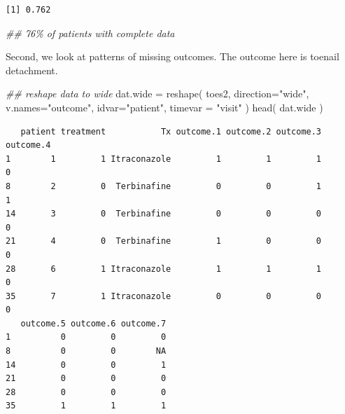 \documentclass[
  letterpaper,
  DIV=11,
  numbers=noendperiod]{scrreprt}
\newenvironment{Shaded}{}{}
\newcommand{\AttributeTok}[1]{\textcolor[rgb]{0.49,0.56,0.16}{#1}}
\newcommand{\DecValTok}[1]{\textcolor[rgb]{0.25,0.63,0.44}{#1}}
\newcommand{\DocumentationTok}[1]{\textcolor[rgb]{0.73,0.13,0.13}{\textit{#1}}}
\newcommand{\FunctionTok}[1]{\textcolor[rgb]{0.02,0.16,0.49}{#1}}
\newcommand{\NormalTok}[1]{#1}
\newcommand{\OtherTok}[1]{\textcolor[rgb]{0.00,0.44,0.13}{#1}}
\newcommand{\SpecialCharTok}[1]{\textcolor[rgb]{0.25,0.44,0.63}{#1}}
\newcommand{\StringTok}[1]{\textcolor[rgb]{0.25,0.44,0.63}{#1}}
\begin{document}
\begin{Shaded}
\end{Shaded}

\begin{verbatim}
[1] 0.762
\end{verbatim}

\begin{Shaded}
\begin{Highlighting}[]
  \DocumentationTok{\#\# 76\% of patients with complete data}
\end{Highlighting}
\end{Shaded}

Second, we look at patterns of missing outcomes. The outcome here is
toenail detachment.

\begin{Shaded}
\begin{Highlighting}[]
\DocumentationTok{\#\# reshape data to wide }
\NormalTok{  dat.wide }\OtherTok{=} \FunctionTok{reshape}\NormalTok{( toes2, }\AttributeTok{direction=}\StringTok{"wide"}\NormalTok{, }\AttributeTok{v.names=}\StringTok{"outcome"}\NormalTok{,}
                    \AttributeTok{idvar=}\StringTok{"patient"}\NormalTok{, }\AttributeTok{timevar =} \StringTok{"visit"}\NormalTok{ )}
  \FunctionTok{head}\NormalTok{( dat.wide )}
\end{Highlighting}
\end{Shaded}

\begin{verbatim}
   patient treatment           Tx outcome.1 outcome.2 outcome.3 outcome.4
1        1         1 Itraconazole         1         1         1         0
8        2         0  Terbinafine         0         0         1         1
14       3         0  Terbinafine         0         0         0         0
21       4         0  Terbinafine         1         0         0         0
28       6         1 Itraconazole         1         1         1         0
35       7         1 Itraconazole         0         0         0         0
   outcome.5 outcome.6 outcome.7
1          0         0         0
8          0         0        NA
14         0         0         1
21         0         0         0
28         0         0         0
35         1         1         1
\end{verbatim}
\end{document}
